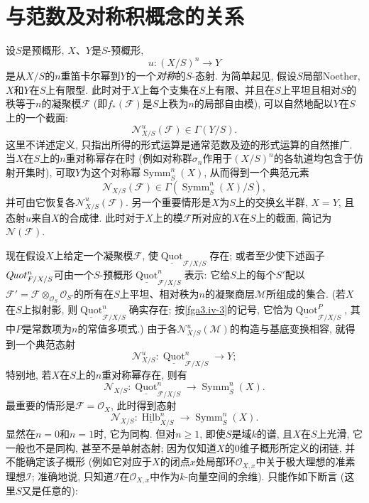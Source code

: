 \chapter{与范数及对称积概念的关系}\thispagestyle{fancy}\label{fga3.iv-6}
\par{}设\(S\)是预概形, \(X\)、\(Y\)是\(S\)-预概形, \[     u\colon (X/S)^n\to  Y   \]是从\(X/S\)的\(n\)重笛卡尔幂到\(Y\)的一个\emph{对称}的\(S\)-态射. 为简单起见, 假设\(S\)局部Noether, \(X\)和\(Y\)在\(S\)上有限型. 此时对于\(X\)上每个支集在\(S\)上有限、并且在\(S\)上平坦且相对\(S\)的秩等于\(n\)的凝聚模\(\mathscr {F}\) (即\(f_*(\mathscr {F})\)是\(S\)上秩为\(n\)的局部自由模), 可以自然地配以\(Y\)在\(S\)上的一个截面: \[     \mathscr {N}_{X/S}^u(\mathscr {F}) \in  \Gamma (Y/S).\] 这里不详述定义, 只指出所得的形式运算是通常范数及迹的形式运算的自然推广. 当\(X\)在\(S\)上的\(n\)重对称幂存在时 (例如对称群\(\sigma _n\)作用于\((X/S)^n\)的各轨道均包含于仿射开集时), 可取\(Y\)为这个对称幂\(\operatorname {Symm}_S^n(X)\), 从而得到一个典范元素\[     \mathscr {N}_{X/S}(\mathscr {F}) \in  \Gamma (\operatorname {Symm}_S^n(X)/S),\] 并可由它恢复各\(\mathscr {N}_{X/S}^u(\mathscr {F})\). 另一个重要情形是\(X\)为\(S\)上的交换幺半群, \(X=Y\), 且态射\(u\)来自\(X\)的合成律. 此时对于\(X\)上的模\(\mathscr {F}\)所对应的\(X\)在\(S\)上的截面, 简记为\(\mathscr {N}(\mathscr {F})\).
\par{}现在假设\(X\)上给定一个凝聚模\(\mathscr {F}\), 使\(\underline {\operatorname {Quot}}_{{\mathscr {F}/X/S}}\)存在; 或者至少使下述函子\(\mathscr {Q}\kern  -.75pt\mathit {uot}_{{\mathscr {F}/X/S}}^n\)可由一个\(S\)-预概形\(\underline {\operatorname {Quot}}_{{\mathscr {F}/X/S}}^n\)表示: 它给\(S\)上的每个\(S'\)配以\(\mathscr {F}'=\mathscr {F}\otimes _{\mathcal {O}_S}\mathcal {O}_{S'}\)的所有在\(S\)上平坦、相对秩为\(n\)的凝聚商层\(\mathscr {M}\)所组成的集合. (若\(X\)在\(S\)上拟射影, 则\(\underline {\operatorname {Quot}}_{{\mathscr {F}/X/S}}^n\)确实存在; 按\cref{fga3.iv-3}的记号, 它恰为\(\underline {\operatorname {Quot}}_{{\mathscr {F}/X/S}}^P\), 其中\(P\)是常数项为\(n\)的常值多项式.) 由于各\(\mathscr {N}_{X/S}^u(\mathscr {M})\)的构造与基底变换相容, 就得到一个典范态射\[     \mathscr {N}_{X/S}^u\colon  \underline {\operatorname {Quot}}_{{\mathscr {F}/X/S}}^n \to  Y;\] 特别地, 若\(X\)在\(S\)上的\(n\)重对称幂存在, 则有\[     \mathscr {N}_{X/S}\colon  \underline {\operatorname {Quot}}_{{\mathscr {F}/X/S}}^n \to  \operatorname {Symm}_S^n(X).\] 最重要的情形是\(\mathscr {F}=\mathcal {O}_X\), 此时得到态射\[     \mathscr {N}_{X/S}\colon  \underline {\operatorname {Hilb}}_{X/S}^n \to  \operatorname {Symm}_S^n(X).\] 显然在\(n=0\)和\(n=1\)时, 它为同构. 但对\(n\geqslant 1\), 即使\(S\)是域\(k\)的谱, 且\(X\)在\(S\)上光滑, 它一般也不是同构, 甚至不是单射态射; 因为仅知道\(X\)的\(0\)维子概形所定义的闭链, 并不能确定该子概形 (例如它对应于\(X\)的闭点\(x\)处局部环\(\mathcal {O}_{X,x}\)中关于极大理想的准素理想\(\mathscr {I}\); 准确地说, 只知道\(\mathscr {I}\)在\(\mathcal {O}_{X,x}\)中作为\(k\)-向量空间的余维). 只能作如下断言 (这里\(S\)又是任意的): 
